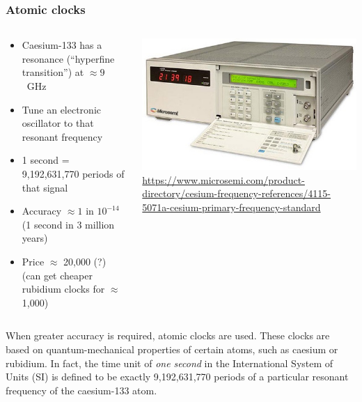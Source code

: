 \begin{frame}
    \label{s:atomic-clocks}
    \frametitle{Atomic clocks}
    \begin{columns}
        \begin{column}{0.5\textwidth}
            \begin{itemize}
                \item Caesium-133 has a resonance (``hyperfine transition'') at $\approx 9$~GHz
                \item Tune an electronic oscillator to that resonant frequency
                \item 1 second = 9,192,631,770 periods of that signal
                \item Accuracy $\approx 1 \text{ in } 10^{-14}$ (1 second in 3 million years)
                \item Price $\approx$ {\textsterling}20,000 (?)\\ (can get cheaper rubidium clocks for $\approx$ {\textsterling}1,000)
            \end{itemize}
        \end{column}
        \begin{column}{0.5\textwidth}
            \includegraphics[width=\textwidth]{images/atomic-clock.jpg}\\[1em]
            \scriptsize\url{https://www.microsemi.com/product-directory/cesium-frequency-references/4115-5071a-cesium-primary-frequency-standard}
        \end{column}
    \end{columns}
\end{frame}
\label{l:atomic-clocks}

When greater accuracy is required, atomic clocks are used.
These clocks are based on quantum-mechanical properties of certain atoms, such as caesium or rubidium.
In fact, the time unit of \emph{one second} in the International System of Units (SI) is defined to be exactly 9,192,631,770 periods of a particular resonant frequency of the caesium-133 atom.

